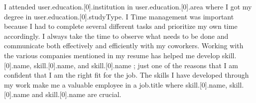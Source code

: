 I attended {{user.education.[0].institution}} in {{user.education.[0].area}} where I got my degree in {{user.education.[0].studyType}}. I Time management was important because I had to complete several different tasks and prioritize my own time accordingly. I always take the time to observe what needs to be done and communicate both effectively and efficiently with my coworkers. Working with the various companies mentioned in my resume has helped me develop {{skill.[0].name}}, {{skill.[0].name}}, and {{skill.[0].name}} ; just one of the reasons that I am confident that I am the right fit for the job. The skills I have developed through my work make me a valuable employee in a {{job.title}} where {{skill.[0].name}}, {{skill.[0].name}} and {{skill.[0].name}} are crucial.
